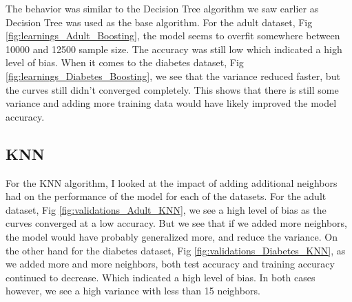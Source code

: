 \documentclass[11pt, twocolumn]{article}
\begin{document}
    The behavior was similar to the Decision Tree algorithm we saw earlier as Decision Tree was used as the base algorithm. For the adult dataset, Fig \ref{fig:learnings_Adult_Boosting}, the model seems to overfit somewhere between 10000 and 12500 sample size. The accuracy was still low which indicated a high level of bias. When it comes to the diabetes dataset, Fig \ref{fig:learnings_Diabetes_Boosting}, we see that the variance reduced faster, but the curves still didn't converged completely. This shows that there is still some variance and adding more training data would have likely improved the model accuracy.


    \subsection{KNN}

    For the KNN algorithm, I looked at the impact of adding additional neighbors had on the performance of the model for each of the datasets. For the adult dataset, Fig \ref{fig:validations_Adult_KNN}, we see a high level of bias as the curves converged at a low accuracy. But we see that if we added more neighbors, the model would have probably generalized more, and reduce the variance. On the other hand for the diabetes dataset, Fig \ref{fig:validations_Diabetes_KNN}, as we added more and more neighbors, both test accuracy and training accuracy continued to decrease. Which indicated a high level of bias. In both cases however, we see a high variance with less than 15 neighbors.
\end{document}

